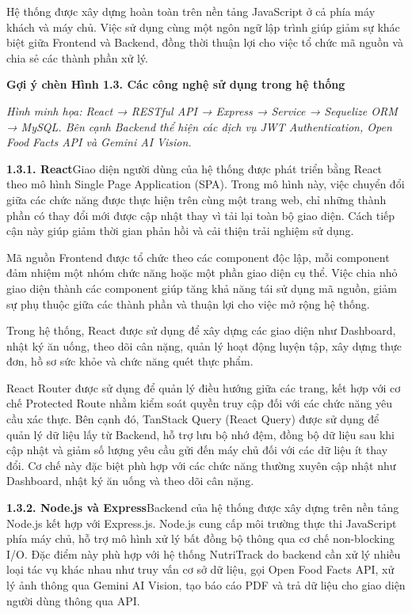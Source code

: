 Hệ thống được xây dựng hoàn toàn trên nền tảng JavaScript ở cả phía máy khách và máy chủ. Việc sử dụng cùng một ngôn ngữ lập trình giúp giảm sự khác biệt giữa Frontend và Backend, đồng thời thuận lợi cho việc tổ chức mã nguồn và chia sẻ các thành phần xử lý.

\textbf{Gợi ý chèn Hình 1.3. Các công nghệ sử dụng trong hệ thống}

\textit{Hình minh họa: React → RESTful API → Express → Service → Sequelize ORM → MySQL. Bên cạnh Backend thể hiện các dịch vụ JWT Authentication, Open Food Facts API và Gemini AI Vision.}

\textbf{1.3.1. React}Giao diện người dùng của hệ thống được phát triển bằng React theo mô hình Single Page Application (SPA). Trong mô hình này, việc chuyển đổi giữa các chức năng được thực hiện trên cùng một trang web, chỉ những thành phần có thay đổi mới được cập nhật thay vì tải lại toàn bộ giao diện. Cách tiếp cận này giúp giảm thời gian phản hồi và cải thiện trải nghiệm sử dụng.

Mã nguồn Frontend được tổ chức theo các component độc lập, mỗi component đảm nhiệm một nhóm chức năng hoặc một phần giao diện cụ thể. Việc chia nhỏ giao diện thành các component giúp tăng khả năng tái sử dụng mã nguồn, giảm sự phụ thuộc giữa các thành phần và thuận lợi cho việc mở rộng hệ thống.

Trong hệ thống, React được sử dụng để xây dựng các giao diện như Dashboard, nhật ký ăn uống, theo dõi cân nặng, quản lý hoạt động luyện tập, xây dựng thực đơn, hồ sơ sức khỏe và chức năng quét thực phẩm.

React Router được sử dụng để quản lý điều hướng giữa các trang, kết hợp với cơ chế Protected Route nhằm kiểm soát quyền truy cập đối với các chức năng yêu cầu xác thực. Bên cạnh đó, TanStack Query (React Query) được sử dụng để quản lý dữ liệu lấy từ Backend, hỗ trợ lưu bộ nhớ đệm, đồng bộ dữ liệu sau khi cập nhật và giảm số lượng yêu cầu gửi đến máy chủ đối với các dữ liệu ít thay đổi. Cơ chế này đặc biệt phù hợp với các chức năng thường xuyên cập nhật như Dashboard, nhật ký ăn uống và theo dõi cân nặng.

\textbf{1.3.2. Node.js và Express}Backend của hệ thống được xây dựng trên nền tảng Node.js kết hợp với Express.js. Node.js cung cấp môi trường thực thi JavaScript phía máy chủ, hỗ trợ mô hình xử lý bất đồng bộ thông qua cơ chế non-blocking I/O. Đặc điểm này phù hợp với hệ thống NutriTrack do backend cần xử lý nhiều loại tác vụ khác nhau như truy vấn cơ sở dữ liệu, gọi Open Food Facts API, xử lý ảnh thông qua Gemini AI Vision, tạo báo cáo PDF và trả dữ liệu cho giao diện người dùng thông qua API.

